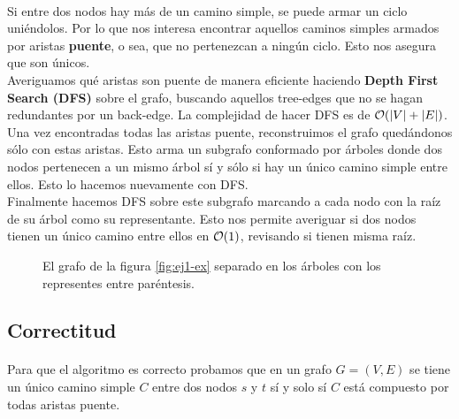 \documentclass[../main.tex]{subfiles}
\begin{document}
\paragraph{} Si entre dos nodos hay más de un camino simple, se puede armar un ciclo uniéndolos. Por lo que nos interesa encontrar aquellos caminos simples armados por aristas \textbf{puente}, o sea, que no pertenezcan a ningún ciclo. Esto nos asegura que son únicos. \\
Averiguamos qué aristas son puente de manera eficiente haciendo \textbf{Depth First Search (DFS)} sobre el grafo, buscando aquellos tree-edges que no se hagan redundantes por un back-edge. La complejidad de hacer DFS es de \(\mathcal{O}(|V| + |E|)\). \\
Una vez encontradas todas las aristas puente, reconstruimos el grafo quedándonos sólo con estas aristas. Esto arma un subgrafo conformado por árboles donde dos nodos pertenecen a un mismo árbol sí y sólo si hay un único camino simple entre ellos. Esto lo hacemos nuevamente con DFS. \\
Finalmente hacemos DFS sobre este subgrafo marcando a cada nodo con la raíz de su árbol como su representante. Esto nos permite averiguar si dos nodos tienen un único camino entre ellos en \(\mathcal{O}(1)\), revisando si tienen misma raíz.

\begin{figure}[H]
\centering

  
\caption{El grafo de la figura \ref{fig:ej1-ex} separado en los árboles con los representes entre paréntesis.}
\label{fig:ej1-res}
\end{figure}

\subsection{Correctitud}
\label{sec:ej1-proof}

\paragraph{} Para que el algoritmo es correcto probamos que en un grafo \(G = (V, E)\) se tiene un único camino simple \(C\) entre dos nodos \(s\) y \(t\) sí y solo sí \(C\) está compuesto por todas aristas puente.
\end{document}
